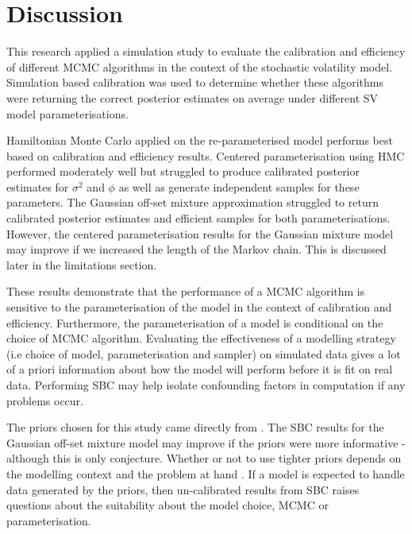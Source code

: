 \documentclass[12pt, a4paper]{article}
\begin{document}
\section{Discussion}
This research applied a simulation study to evaluate the calibration and efficiency of different MCMC algorithms in the context of the stochastic volatility model. Simulation based calibration was used to determine whether these algorithms were returning the correct posterior estimates on average under different SV model parameterisations. 

Hamiltonian Monte Carlo applied on the re-parameterised model performs best based on calibration and efficiency results. Centered parameterisation using HMC performed moderately well but struggled to produce calibrated posterior estimates for $\sigma^2$ and $\phi$ as well as generate independent samples for these parameters. The Gaussian off-set mixture approximation struggled to return calibrated posterior estimates and efficient samples for both parameterisations. However, the centered parameterisation results for the Gaussian mixture model may improve if we increased the length of the Markov chain. This is discussed later in the limitations section. 

These results demonstrate that the performance of a MCMC algorithm is sensitive to the parameterisation of the model in the context of calibration and efficiency. Furthermore, the parameterisation of a model is conditional on the choice of MCMC algorithm. Evaluating the effectiveness of a modelling strategy (i.e choice of model, parameterisation and sampler) on simulated data gives a lot of a priori information about how the model will perform before it is fit on real data. Performing SBC may help isolate confounding factors in computation if any problems occur. 

The priors chosen for this study came directly from \citet{kim1998stochastic}. The SBC results for the Gaussian off-set mixture model may improve if the priors were more informative - although this is only conjecture. Whether or not to use tighter priors depends on the modelling context and the problem at hand \citep{gelman2017prior}. If a model is expected to handle data generated by the priors, then un-calibrated results from SBC raises questions about the suitability about the model choice, MCMC or parameterisation. 
\end{document}
